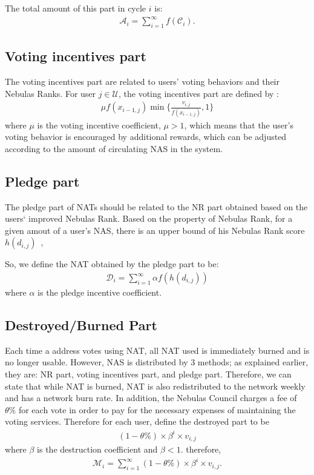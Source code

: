 The total amount of this part  in cycle $i$ is:
\begin{align}
\mathcal{A}_i = \sum_{i=1}^{\infty}f(\mathcal{C}_i).
\end{align}

\subsection{Voting incentives part}
The voting incentives part are related to users' voting behaviors and their Nebulas Ranks. For user $j \in \mathcal{U}$, the voting incentives part are defined by :
\begin{align}
\mu f(x_{i-1,j}) \min\{\frac{v_{i,j}}{f(x_{i-1,j})},1\}
\end{align}
\noindent where $\mu$ is the voting incentive coefficient, $\mu > 1$, which means that the user's voting behavior is encouraged by additional rewards, which can be adjusted according to the amount of circulating NAS in the system.

\subsection{Pledge part}
The pledge part of NATs should be related to the NR part obtained based on the users‘ improved Nebulas Rank. Based on the property of Nebulas Rank, for a given amout of a user's NAS, there is an upper bound of his Nebulas Rank score $h(d_{i,j})$~\cite{ImproveNR},

So, we define the NAT obtained by the pledge part to be:
\begin{align}
\mathcal{D}_i = \sum_{i=1}^{\infty}\alpha f(h(d_{i,j}))
\end{align}
\noindent where $\alpha$ is the pledge incentive coefficient.


\subsection{Destroyed/Burned Part}
\label{burn}
Each time a address votes using NAT, all NAT used is immediately burned and is no longer usable. However, NAS is distributed by 3 methods; as explained earlier, they are: NR part, voting incentives part, and pledge part. Therefore, we can state that while NAT is burned, NAT is also redistributed to the network weekly and has a network burn rate. In addition, the Nebulas Council charges a fee of $\theta\%$ for each vote in order to pay for the necessary expenses of maintaining the voting services. Therefore for each user, define the destroyed part to be\begin{align}
(1-\theta\%) \times \beta^i \times v_{i,j}
\end{align}
\noindent where $\beta$ is the destruction coefficient and $\beta < 1$. therefore,
\begin{align}
    \mathcal{M}_i = \sum_{i=1}^{\infty} (1-\theta\%) \times \beta^i \times v_{i,j} .
\end{align}

